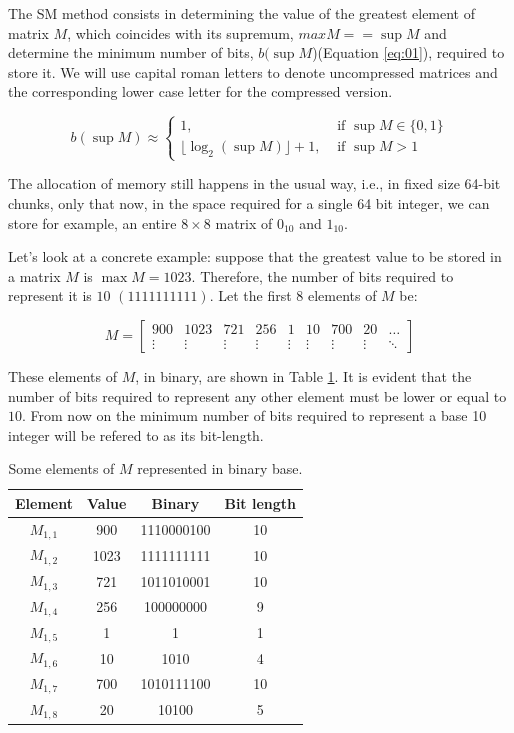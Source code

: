 \documentclass[10pt]{article}
\begin{document}
The SM method consists in determining the value of the greatest element of matrix $M$, which coincides with its supremum, $max M == \sup M$  and determine the minimum number of bits, $b(\sup M$)(Equation \ref{eq:01}), required to store it. We will use capital roman letters to denote uncompressed matrices and the corresponding lower case letter for the compressed version.

\begin{equation} \label{eq:01}
 b(\sup M) \approx \begin{cases}
	1, &  \text{ if } \sup M \in \{0,1\} \\ 
	\lfloor \log_2(\sup M)  \rfloor + 1,  & \text{ if } \sup M > 1  
	\end{cases}
\end{equation}

The allocation of memory still happens in the usual way, i.e., in fixed size 64-bit chunks, only that now, in the space required for a single 64 bit integer, we can store for example, an entire $8\times 8$ matrix of $0_{10}$ and $1_{10}$. 

Let's look at a concrete example: suppose that the greatest value to be stored in a matrix $M$ is $\max M=1023$. Therefore, the number of bits required to represent it is $10$ $(1111111111)$. Let the first 8 elements of $M$ be:

\begin{equation} \label{eq:02}
  M = \begin{bmatrix}
  900 & 1023 & 721 & 256 & 1 & 10 & 700 & 20 & \hdots\\ 
  \vdots & \vdots & \vdots & \vdots & \vdots & \vdots & \vdots & \vdots & \ddots 
  \end{bmatrix}
\end{equation}

These elements of $M$, in binary, are shown in Table \ref{tab:01}. It is evident that the number of bits required to represent any other element must be lower or equal to $10$. From now on the minimum number of bits required to represent a base 10 integer will be refered to as its bit-length.

\begin{table}[h]
 \centering
 \caption{Some elements of $M$ represented in binary base.}
 \begin{tabular}{cccc} 
  \hline 
  Element & Value  & Binary & Bit length\\
  \hline
  $M_{1,1}$ & 900  & 1110000100 & 10\\
  $M_{1,2}$ & 1023 & 1111111111 & 10\\
  $M_{1,3}$ & 721  & 1011010001 & 10\\
  $M_{1,4}$ & 256  & 100000000  & 9\\
  $M_{1,5}$ & 1    & 1          & 1\\
  $M_{1,6}$ & 10   & 1010       & 4\\
  $M_{1,7}$ & 700  & 1010111100 & 10\\
  $M_{1,8}$ & 20   & 10100      & 5\\
  \hline
 \end{tabular}
 \label{tab:01}
\end{table}
\end{document}
